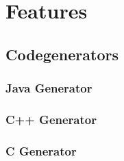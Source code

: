 \chapter{\eTrice{} Features}

\section{Codegenerators}

\subsection{Java Generator}

\subsection{C++ Generator}

\subsection{C Generator}

